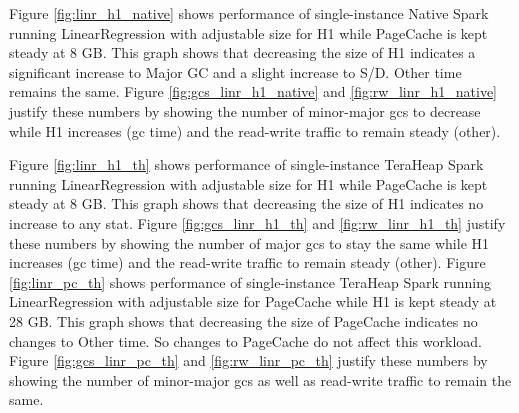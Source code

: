 Figure \ref{fig:linr_h1_native} shows performance of single-instance
Native Spark running LinearRegression with adjustable size for H1
while PageCache is kept steady at 8 GB. This graph shows that
decreasing the size of H1 indicates a significant increase to Major GC
and a slight increase to S/D. Other time remains the same.
Figure \ref{fig:gcs_linr_h1_native} and \ref{fig:rw_linr_h1_native} justify
these numbers by showing the number of minor-major gcs to decrease
while H1 increases (gc time) and the read-write traffic to remain
steady (other). 

Figure \ref{fig:linr_h1_th} shows performance of
single-instance TeraHeap Spark running LinearRegression with
adjustable size for H1 while PageCache is kept steady at 8 GB. This
graph shows that decreasing the size of H1 indicates no increase to
any stat. Figure \ref{fig:gcs_linr_h1_th} and \ref{fig:rw_linr_h1_th}
justify these numbers by showing the number of major gcs to stay the
same while H1 increases (gc time) and the read-write traffic to remain
steady (other). 
Figure \ref{fig:linr_pc_th} shows performance of
single-instance TeraHeap Spark running LinearRegression with
adjustable size for PageCache while H1 is kept steady at 28 GB. This
graph shows that decreasing the size of PageCache indicates no changes
to Other time. So changes to PageCache do not affect this workload.
Figure \ref{fig:gcs_linr_pc_th} and \ref{fig:rw_linr_pc_th} justify
these numbers by showing the number of minor-major gcs as well as
read-write traffic to remain the same.

